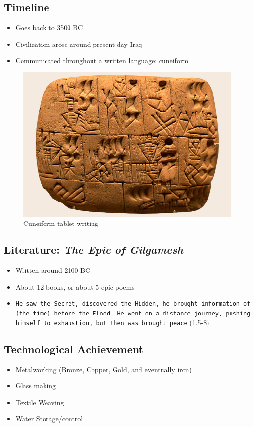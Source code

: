 \documentclass[11pt]{article}
\begin{document}
\subsection{Timeline}
\label{sec-3-6}
\begin{itemize}
\item Goes back to 3500 BC

\item Civilization arose around present day Iraq

\item Communicated throughout a written language: cuneiform
\end{itemize}
\begin{figure}[htb]
\centering
\includegraphics[width=.9\linewidth]{./img/CuneiformTablet.png}
\caption{Cuneiform tablet writing}
\end{figure}

\subsection{Literature: \emph{The Epic of Gilgamesh}}
\label{sec-3-7}
\begin{itemize}
\item Written around 2100 BC

\item About 12 books, or about 5 epic poems

\item \texttt{He saw the Secret, discovered the Hidden, he brought information of (the time) before the Flood. He went on a distance journey, pushing himself to exhaustion, but then was brought peace} (1.5-8)
\end{itemize}

\subsection{Technological Achievement}
\label{sec-3-8}
\begin{itemize}
\item Metalworking (Bronze, Copper, Gold, and eventually iron)

\item Glass making

\item Textile Weaving

\item Water Storage/control
\end{itemize}
\end{document}

